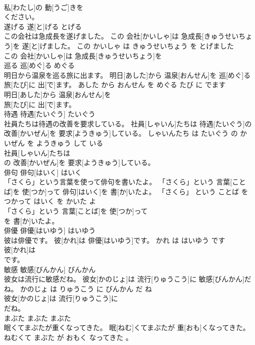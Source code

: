\documentclass[8pt]{extreport}
\begin{document}
\begin{CJK}{UTF8}{min}
\\	私[わたし]の 動[うご]きを
\\	ください。			
\\	遂げる	遂[と]げる	とげる	
\\	この会社は急成長を遂げました。	この 会社[かいしゃ]は 急成長[きゅうせいちょう]を 遂[と]げました。	この かいしゃ は きゅうせいちょう を とげました	
\\	この 会社[かいしゃ]は 急成長[きゅうせいちょう]を
\\	巡る	巡[めぐ]る	めぐる	
\\	明日から温泉を巡る旅に出ます。	明日[あした]から 温泉[おんせん]を 巡[めぐ]る 旅[たび]に 出[で]ます。	あした から おんせん を めぐる たび に でます	
\\	明日[あした]から 温泉[おんせん]を
\\	旅[たび]に 出[で]ます。			
\\	待遇	待遇[たいぐう]	たいぐう	
\\	社員たちは待遇の改善を要求している。	社員[しゃいん]たちは 待遇[たいぐう]の 改善[かいぜん]を 要求[ようきゅう]している。	しゃいんたち は たいぐう の かいぜん を ようきゅう して いる	
\\	社員[しゃいん]たちは
\\	の 改善[かいぜん]を 要求[ようきゅう]している。			
\\	俳句	俳句[はいく]	はいく	
\\	「さくら」という言葉を使って俳句を書いたよ。	「さくら」という 言葉[ことば]を 使[つか]って 俳句[はいく]を 書[か]いたよ。	「さくら」 という ことば を つかって はいく を かいた よ	
\\	「さくら」という 言葉[ことば]を 使[つか]って
\\	を 書[か]いたよ。			
\\	俳優	俳優[はいゆう]	はいゆう	
\\	彼は俳優です。	彼[かれ]は 俳優[はいゆう]です。	かれ は はいゆう です	
\\	彼[かれ]は
\\	です。			
\\	敏感	敏感[びんかん]	びんかん	
\\	彼女は流行に敏感だね。	彼女[かのじょ]は 流行[りゅうこう]に 敏感[びんかん]だね。	かのじょ は りゅうこう に びんかん だ ね	
\\	彼女[かのじょ]は 流行[りゅうこう]に
\\	だね。			
\\	まぶた	まぶた	まぶた	
\\	眠くてまぶたが重くなってきた。	眠[ねむ]くてまぶたが 重[おも]くなってきた。	ねむくて まぶた が おもく なってきた 。	

\end{CJK}
\end{document}
